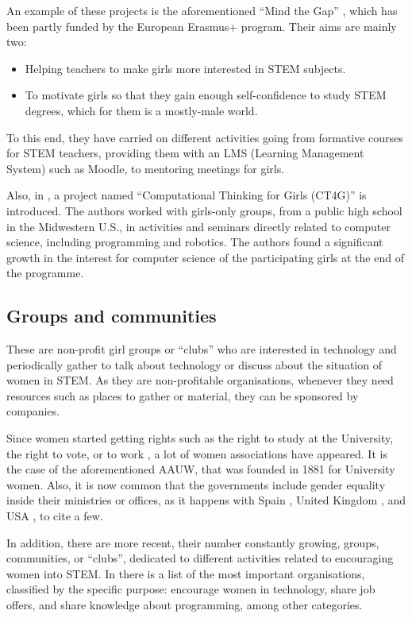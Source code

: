 \documentclass[journal,transmag]{IEEEtran}
\begin{document}
An example of these projects is the aforementioned ``Mind the Gap'' \cite{mtg:site}, which has been partly funded by the European Erasmus+ program. Their aims are mainly two:

\begin{itemize}
  \item Helping teachers to make girls more interested in STEM subjects.
  \item To motivate girls so that they gain enough self-confidence to study STEM degrees, which for them is a mostly-male world.
\end{itemize}

To this end, they have carried on different activities going from formative courses for STEM teachers, providing them with an LMS (Learning Management System) such as Moodle, to mentoring meetings for girls.

Also, in \cite{brady2016all}, a project named ``Computational Thinking for Girls (CT4G)'' is introduced. The authors worked with girls-only groups, from a public high school in the Midwestern U.S., in activities and seminars directly related to computer science, including programming and robotics. The authors found a significant growth in the interest for computer science of the participating girls at the end of the programme.

\subsection{Groups and communities}

These are non-profit girl groups or ``clubs'' who are interested in technology and periodically gather to talk about technology or discuss about the situation of women in STEM. As they are non-profitable organisations, whenever they need resources such as places to gather or material, they can be sponsored by companies.

Since women started getting rights such as the right to study at the University, the right to vote, or to work \cite{glover1995women}, a lot of women associations have appeared. It is the case of the aforementioned AAUW, that was founded in 1881 for University women. Also, it is now common that the governments include gender equality inside their ministries or offices, as it happens with Spain \cite{inmujer:site}, United Kingdom \cite{ukgequ:site}, and USA \cite{uswomen:site, aauw:site}, to cite a few.

In addition, there are more recent, their number constantly growing, groups, communities, or ``clubs'', dedicated to different activities related to encouraging women into STEM. In \cite{kira2012} there is a list of the most important organisations, classified by the specific purpose: encourage women in technology, share job offers, and share knowledge about programming, among other categories.
\end{document}

